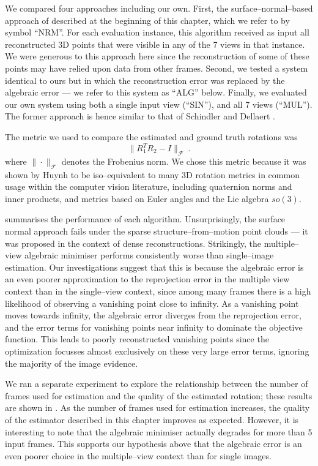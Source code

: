 We compared four approaches including our own. First, the
surface--normal--based approach of \cite{Furukawa09} described at the
beginning of this chapter, which we refer to by symbol ``NRM''. For
each evaluation instance, this algorithm received as input all
reconstructed 3D points that were visible in any of the 7 views in
that instance. We were generous to this approach here since the
reconstruction of some of these points may have relied upon data from
other frames. Second, we tested a system identical
to ours but in which the reconstruction error was replaced by the
algebraic error --- we refer to this system as ``ALG'' below. Finally, we
evaluated our own system using both a single input view (``SIN''), and
all 7 views (``MUL''). The former approach is hence similar to that of
Schindler and Dellaert \cite{Schindler2004}.

The metric we used to compare the estimated and ground truth
rotations was
\begin{equation}
  \| R_1^T R_2 - I \|_{\mathcal{F}} ~.
  \label{eq:rotation-metric}
\end{equation}
where $\|\cdot\|_{\mathcal{F}}$ denotes the Frobenius norm. We chose
this metric because it was shown by Huynh \cite{Huynh2009} to be
iso--equivalent to many 3D rotation metrics in common usage within
the computer vision literature, including quaternion norms and inner
products, and metrics based on Euler angles and the Lie algebra
$so(3)$.

 summarises the performance of each
algorithm. Unsurprisingly, the surface normal approach fails under the
sparse structure--from--motion point clouds --- it was proposed in the
context of dense reconstructions. Strikingly, the multiple--view
algebraic minimiser performs consistently worse than single--image
estimation. Our investigations suggest that this is because the
algebraic error is an even poorer approximation to the reprojection
error in the multiple view context than in the single--view context,
since among many frames there is a high likelihood of observing a
vanishing point close to infinity. As a vanishing point moves towards
infinity, the algebraic error diverges from the reprojection error,
and the error terms for vanishing points near infinity to dominate the
objective function. This leads to poorly reconstructed vanishing
points since the optimization focusses almost exclusively on these
very large error terms, ignoring the majority of the image evidence.\changedsinceviva

We ran a separate experiment to explore the relationship between the
number of frames used for estimation and the quality of the estimated
rotation; these results are shown in . As the
number of frames used for estimation increases, the quality of the
estimator described in this chapter improves as expected. However, it
is interesting to note that the algebraic minimiser actually degrades
for more than 5 input frames. This supports our hypothesis above that
the algebraic error is an even poorer choice in the multiple--view
context than for single images.

